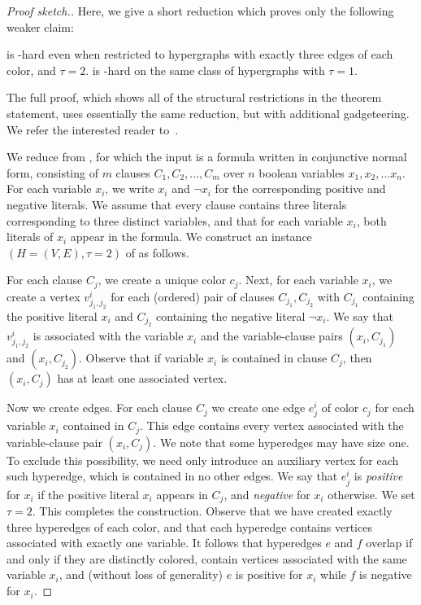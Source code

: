 \begin{proof}[Proof sketch.]
    Here, we give a short reduction which proves only the following weaker claim:
    
    \begin{claim}
        \cfminECC{} is -hard even when restricted to hypergraphs with exactly three edges of each color, and $\tau = 2$. \cfmaxECC{} is -hard on the same class of hypergraphs with $\tau = 1$.
    \end{claim}
    
    The full proof, which shows all of the structural restrictions in the theorem statement, uses essentially the same reduction, but with additional gadgeteering. We refer the interested reader to~.

    \bigskip
    We reduce from \threeSAT{}, for which the input is a formula written in conjunctive normal form, consisting of $m$ clauses $C_1, C_2, \ldots, C_m$ over $n$ boolean variables $x_1, x_2, \ldots x_n$.
    For each variable $x_i$, we write $x_i$ and $\neg x_i$ for the corresponding positive and negative literals. We assume that every clause contains three literals corresponding to three distinct variables, and that for each variable $x_i$, both literals of $x_i$ appear in the formula.
    We construct an instance $(H = (V, E), \tau = 2)$ of \cfminECC{} as follows.

    For each clause $C_j$, we create a unique color $c_j$.
    Next, for each variable $x_i$, we create a vertex $v_{j_1, j_2}^i$ for each (ordered) pair of clauses $C_{j_1}, C_{j_2}$ with $C_{j_1}$ containing the positive literal $x_i$ and $C_{j_2}$ containing the negative literal $\neg x_i$.
    We say that $v_{j_1, j_2}^i$ is associated with the variable $x_i$ and the variable-clause pairs $(x_i, C_{j_1})$ and $(x_i, C_{j_2})$. Observe that if variable $x_i$ is contained in clause $C_j$, then $(x_i, C_j)$ has at least one associated vertex.

    Now we create edges. For each clause $C_j$ we create one edge $e_j^i$ of color $c_j$ for each variable $x_i$ contained in $C_j$. This edge contains every vertex associated with the variable-clause pair $(x_i, C_j)$.
    We note that some hyperedges may have size one. To exclude this possibility, we need only introduce an auxiliary vertex for each such hyperedge, which is contained in no other edges.
    We say that $e_j^i$ is \emph{positive} for $x_i$ if the positive literal $x_i$ appears in $C_j$, and \emph{negative} for $x_i$ otherwise.
    We set $\tau = 2$.
    This completes the construction.
    Observe that we have created exactly three hyperedges of each color, and that each hyperedge contains vertices associated with exactly one variable.
    It follows that hyperedges $e$ and $f$ overlap if and only if they are distinctly colored, contain vertices associated with the same variable $x_i$, and (without loss of generality) $e$ is positive for $x_i$ while $f$ is negative for $x_i$.   


\end{proof}
